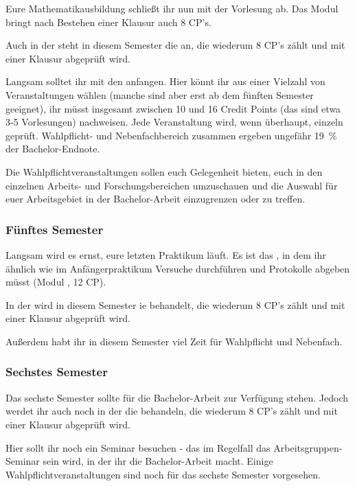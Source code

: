 Eure Mathematikausbildung schließt ihr nun mit der Vorlesung  ab.
Das Modul  bringt nach Bestehen einer Klausur auch 8 CP's.
\bigskip

Auch in der  steht in diesem Semester die  an, die wiederum 8 CP's zählt und mit einer Klausur abgeprüft wird.
\bigskip

Langsam solltet ihr mit den \label{Wahlpflicht} anfangen.
Hier könnt ihr aus einer Vielzahl von Veranstaltungen wählen (manche sind aber erst ab dem fünften Semester geeignet),
ihr müsst insgesamt zwischen 10 und 16 Credit Points (das sind etwa 3-5 Vorlesungen) nachweisen. Jede Veranstaltung wird, wenn überhaupt, einzeln geprüft. Wahlpflicht- und Nebenfachbereich zusammen ergeben ungefähr 19~\% der Bachelor-Endnote.
\bigskip

Die Wahlpflichtveranstaltungen sollen euch Gelegenheit bieten, euch in den einzelnen Arbeits- und Forschungsbereichen
umzuschauen und die Auswahl für euer Arbeitsgebiet in der Bachelor-Arbeit einzugrenzen oder zu treffen.

\subsubsection{Fünftes Semester}

Langsam wird es ernst, eure letzten Praktikum läuft. Es ist das , in dem ihr ähnlich wie im Anfängerpraktikum Versuche durchführen und Protokolle abgeben müsst (Modul , 12 CP).

In der  wird in diesem Semester ie  behandelt, die wiederum 8 CP's zählt und mit einer Klausur abgeprüft wird.
\bigskip

Außerdem habt ihr in diesem Semester viel Zeit für Wahlpflicht und Nebenfach.

\subsubsection{Sechstes Semester}
Das sechste Semester sollte für die Bachelor-Arbeit zur Verfügung stehen. Jedoch werdet ihr auch noch in der  die   behandeln, die wiederum 8 CP's zählt und mit einer Klausur abgeprüft wird.
\bigskip

Hier sollt ihr noch ein Seminar besuchen - das im Regelfall das Arbeitsgruppen-Seminar sein wird,
in der ihr die Bachelor-Arbeit macht.
Einige Wahlpflichtveranstaltungen sind noch für das sechste Semester vorgesehen.
\bigskip

